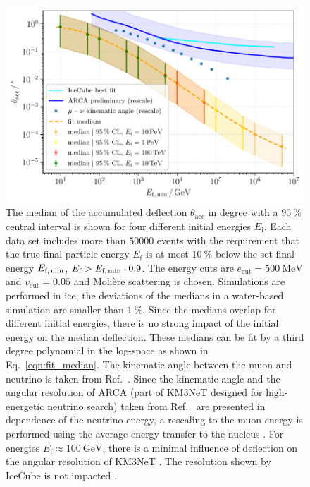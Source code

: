 \begin{figure}
    \centering 
    \includegraphics{../../deflection/plots/FINAL/fit_median_defl_cut_10percent_only_poly_new_resolution_rescale_no_icecube_paper_final.pdf}
    \caption{The median of the accumulated deflection $\theta_{\text{acc}}$ in degree 
    with a $\SI{95}{\percent}$ 
    central interval is shown for four different initial energies $E_{\text{i}}$. 
    Each data set includes more than $\num{50000}$ events with the requirement 
    that the true final particle energy $E_{\text{f}}$ is at most 
    $\SI{10}{\percent}$ below the set final energy $E_{\text{f,\,min}}$,   
    $E_{\text{f}} > E_{\text{f,\,min}} \cdot 0.9$. The energy cuts are $e_{\mathrm{cut}} = \SI{500}{\mega\electronvolt}$ and $v_{\mathrm{cut}} = 0.05$ and 
    Molière scattering is chosen. Simulations are performed in ice, the deviations 
    of the medians in a water-based simulation are smaller than $\SI{1}{\percent}$.
    Since the medians overlap for different initial energies, there is no 
    strong impact of the initial energy on the median deflection. These 
    medians can be fit by a third degree polynomial in the log-space as 
    shown in Eq.~\eqref{eqn:fit_median}. The kinematic angle between the muon and 
    neutrino is taken from Ref.~\cite{KM3NeT_Resolution2016}. Since the kinematic angle and 
    the angular resolution of ARCA (part of KM3NeT designed for high-energetic neutrino search) taken from Ref.~\cite{KM3NeT_Resolution2016, KM3NeT_Resolution2021} are 
    presented in dependence of the neutrino energy, a rescaling to the muon energy is performed 
    using the average energy transfer to the nucleus \cite{GANDHI199681}. 
    For energies 
    $E_{\text{f}} \approx \SI{100}{\giga\electronvolt}$, there is a minimal influence of deflection on the angular resolution of 
    KM3NeT \cite{KM3NeT_Resolution2021}. The resolution shown by IceCube is not 
    impacted \cite{IceCube_Resolution2021}.}
    \label{fig:fit_median}
\end{figure}

